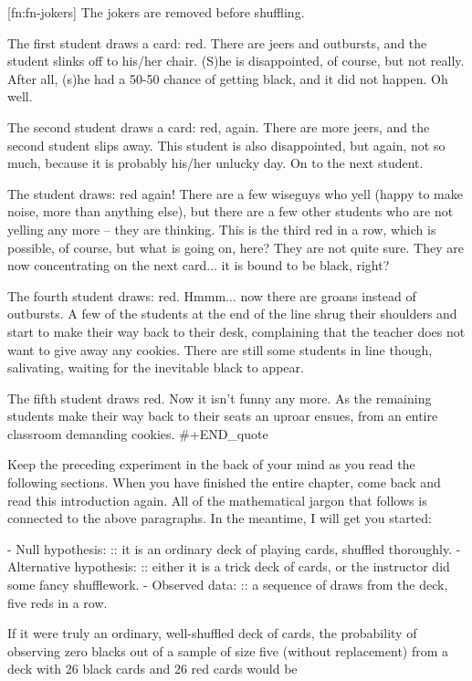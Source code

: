 [fn:fn-jokers] The jokers are removed before shuffling.

The first student draws a card: red. There are jeers and outbursts,
and the student slinks off to his/her chair. (S)he is disappointed, of
course, but not really. After all, (s)he had a 50-50 chance of getting
black, and it did not happen. Oh well.

The second student draws a card: red, again. There are more jeers, and
the second student slips away. This student is also disappointed, but
again, not so much, because it is probably his/her unlucky day. On to
the next student.

The student draws: red again! There are a few wiseguys who yell (happy
to make noise, more than anything else), but there are a few other
students who are not yelling any more -- they are thinking. This is
the third red in a row, which is possible, of course, but what is
going on, here? They are not quite sure. They are now concentrating on
the next card... it is bound to be black, right?

The fourth student draws: red. Hmmm... now there are groans instead of
outbursts. A few of the students at the end of the line shrug their
shoulders and start to make their way back to their desk, complaining
that the teacher does not want to give away any cookies. There are
still some students in line though, salivating, waiting for the
inevitable black to appear.

The fifth student draws red. Now it isn't funny any more. As the
remaining students make their way back to their seats an uproar
ensues, from an entire classroom demanding cookies.
#+END_quote

Keep the preceding experiment in the back of your mind as you read the
following sections. When you have finished the entire chapter, come
back and read this introduction again. All of the mathematical jargon
that follows is connected to the above paragraphs. In the meantime, I
will get you started:

- Null hypothesis: :: it is an ordinary deck of playing cards,
     shuffled thoroughly.
- Alternative hypothesis: :: either it is a trick deck of cards, or
     the instructor did some fancy shufflework.
- Observed data: :: a sequence of draws from the deck, five reds in a row.

If it were truly an ordinary, well-shuffled deck of cards, the
probability of observing zero blacks out of a sample of size five
(without replacement) from a deck with 26 black cards and 26 red cards
would be

